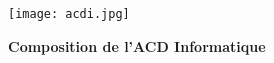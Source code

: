 \documentclass{article}
\date{}
\title{}
\begin{document}
\centerline{\texttt{[image: acdi.jpg]}}
\vspace{3mm}
\centerline{\LARGE \textbf{Composition de l'ACD Informatique}}
\end{document}
